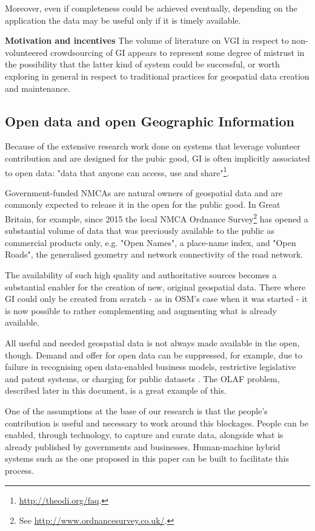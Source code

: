 Moreover, even if completeness could be achieved eventually, depending on the application the data may be useful only if it is timely available.

\textbf{Motivation and incentives} The volume of literature on VGI in respect to non-volunteered crowdsourcing of GI appears to represent some degree of mistrust in the possibility that the latter kind of system could be successful, or worth exploring in general in respect to traditional practices for geospatial data creation and maintenance.   

\subsection{Open data and open Geographic Information}
\label{open-data-and-gi}

Because of the extensive research work done on systems that leverage volunteer contribution and are designed for the pubic good, GI is often implicitly associated to open data: "data that anyone can access, use and share"\footnote{\url{http://theodi.org/faq}.}. 

Government-funded NMCAs are natural owners of geospatial data and are commonly expected to release it in the open for the public good. In Great Britain, for example, since 2015 the local NMCA Ordnance Survey\footnote{See \url{http://www.ordnancesurvey.co.uk/}.} has opened a substantial volume of data that was previously available to the public as commercial products only, e.g. "Open Names", a place-name index, and "Open Roads", the generalised geometry and network connectivity of the road network.
	
The availability of such high quality and authoritative sources becomes a substantial enabler for the creation of new, original geospatial data. There where GI could only be created from scratch - as in OSM's case when it was started - it is now possible to rather complementing and augmenting what is already available.

All useful and needed geospatial data is not always made available in the open, though. Demand and offer for open data can be suppressed, for example, due to failure in recognising open data-enabled business models, restrictive legislative and patent systems, or charging for public datasets \cite{shadboltpaf}. The OLAF problem, described later in this document, is a great example of this.
	
One of the assumptions at the base of our research is that the people's contribution is useful and necessary to work around this blockages. People can be enabled, through technology, to capture and curate data, alongside what is already published by governments and businesses. Human-machine hybrid systems such as the one proposed in this paper can be built to facilitate this process.

